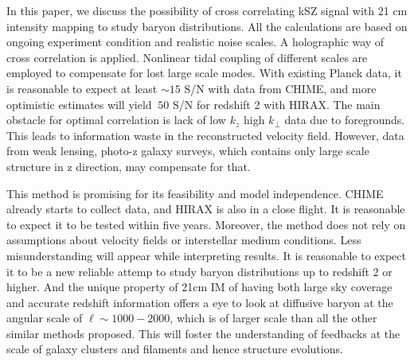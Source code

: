 In this paper, we discuss the possibility of cross correlating kSZ signal with 
21 cm intensity mapping to study baryon distributions. 
All the calculations are based on ongoing experiment condition and realistic noise scales. 
A holographic way of cross correlation is applied. 
Nonlinear tidal coupling of different scales are employed to compensate for 
lost large scale modes. 
With existing Planck data, 
it is reasonable to expect at least $\sim15$ S/N with data from CHIME, 
and more optimistic estimates will yield $~50$ S/N for redshift 2 with HIRAX. 
The main obstacle for optimal correlation 
is lack of low $k_z$ high $k_\perp$ data due to foregrounds. 
This leads to information waste in the reconstructed velocity field. 
However, data from weak lensing, photo-z galaxy surveys, which 
contains only large scale structure in z direction, may 
compensate for that. 
 
This method is promising for its feasibility and model independence. 
CHIME already starts to collect data, 
and HIRAX is also in a close flight. 
It is reasonable to expect it to be tested within five years. 
Moreover, the method does not rely on assumptions about velocity fields 
or interstellar medium conditions. 
Less misunderstanding will appear while interpreting results. 
It is reasonable to expect it to be a new 
reliable attemp to study baryon distributions up to 
redshift 2 or higher. 
And the unique property of 21cm IM of having both large sky coverage and 
accurate redshift information 
offers a eye to look at diffusive baryon 
at the angular scale of $\ell\sim 1000-2000$, 
which is of larger scale than all the other similar methods 
proposed. 
This will foster the understanding of feedbacks at the scale of 
galaxy clusters and filaments 
and hence structure evolutions.
